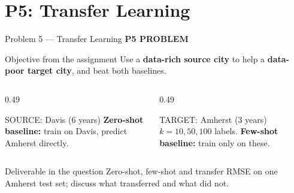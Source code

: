 \documentclass[aspectratio=169,11pt]{beamer}
\newcommand{\sectiontag}[1]{{\footnotesize\usebeamercolor[fg]{structure}\textbf{#1}}\par\vspace{0.10cm}}
\begin{document}
\section{P5: Transfer Learning}

\begin{frame}{Problem 5 — Transfer Learning}
\sectiontag{P5 \quad PROBLEM}
\begin{block}{Objective from the assignment}
Use a \textbf{data-rich source city} to help a \textbf{data-poor target city}, and beat both baselines.
\end{block}
\vspace{0.05cm}
\begin{columns}[T,totalwidth=\textwidth]
\begin{column}{0.49\textwidth}
\begin{block}{SOURCE: Davis (6 years)}
\small \textbf{Zero-shot baseline:} train on Davis, predict Amherst directly.
\end{block}
\end{column}
\begin{column}{0.49\textwidth}
\begin{block}{TARGET: Amherst (3 years)}
\small $k=10,50,100$ labels. \textbf{Few-shot baseline:} train only on these.
\end{block}
\end{column}
\end{columns}
\vspace{0.12cm}
\begin{block}{Deliverable in the question}
\small Zero-shot, few-shot and transfer RMSE on one Amherst test set; discuss what transferred and what did not.
\end{block}
\end{frame}
\end{document}
